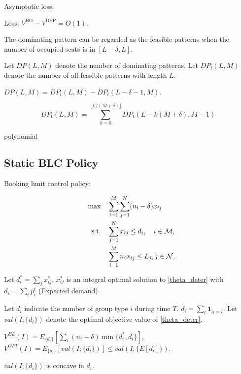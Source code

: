 Asymptotic loss:
\begin{lem}
    Loss: $V^{\text{HO}} - V^{\text{DPP}} = O(1)$. 
\end{lem}

The dominating pattern can be regarded as the feasible patterns when the number of occupied seats is in $[L-\delta, L]$.

Let $DP(L, M)$ denote the number of dominating patterns. Let $DP_{t} (L, M)$ denote the number of all feasible patterns with length $L$.

$DP(L, M) = DP_{t} (L, M) - DP_{t} (L-\delta-1, M)$.

\begin{equation}
DP_{\text {t}}(L, M)=\sum_{k=0}^{\lfloor L /(M+\delta)\rfloor} D P_{\text {t}}(L-k(M+\delta), M-1)
\end{equation}

polynomial

\newpage

\subsection{Static BLC Policy}
Booking limit control policy:

\begin{align}
    \quad \max \quad & \sum_{i=1}^{M}  \sum_{j= 1}^{N} (n_i - \delta) x_{ij} \label{theta_deter} \\
    \text {s.t.} \quad & \sum_{j= 1}^{N} x_{ij} \leq d_{i}, \quad i \in \mathcal{M}, \notag \\ 
    & \sum_{i=1}^{M} n_{i} x_{ij} \leq L_j, j \in \mathcal{N}, \notag 
\end{align}

Let $d_{i}^{*} = \sum_{j} x_{ij}^{*}$, $x_{ij}^{*}$ is an integral optimal solution to \eqref{theta_deter} with $d_{i} = \sum_{t} p_{i}^{t}$ (Expected demand).

Let $d_{i}$ indicate the number of group type $i$ during time $T$. $d_{i} = \sum_{t} \bm{1}_{i_{t} = i}$.
Let $val(I; \{d_{i}\})$ denote the optimal objective value of \eqref{theta_deter}.

$V^{BL}(I) = E_{\{d_{i}\}}[\sum_{i} (n_{i}-\delta) \min\{d_{i}^{*}, d_{i}\}]$, $V^{OPT}(I) = E_{\{d_{i}\}} [val(I; \{d_{i}\})] \leq val(I; \{E[d_{i}]\})$.

$val(I; \{d_{i}\})$ is concave in $d_{i}$.

